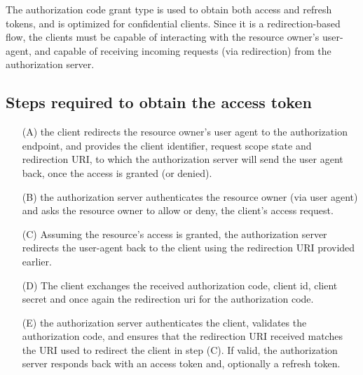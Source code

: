 \documentclass[11pt]{style}
\begin{document}
The authorization code grant type is used to obtain both access and refresh
tokens, and is optimized for confidential clients.
Since it is a redirection-based flow, the clients must be capable of interacting
with the resource owner's user-agent, and capable of receiving incoming requests
(via redirection) from the authorization server.

\subsection{Steps required to obtain the access token}
\begin{enumerate}
    \item[(A)] the client redirects the resource owner's user agent to the
        authorization endpoint, and provides the client identifier, request
        scope state and redirection URI, to which the authorization server will
        send the user agent back, once the access is granted (or denied).
    \item[(B)] the authorization server authenticates the resource owner (via
        user agent) and asks the resource owner to allow or deny, the client's
        access request.
    \item[(C)] Assuming the resource's access is granted, the authorization
        server redirects the user-agent back to the client using the redirection
        URI provided earlier.
    \item[(D)] The client exchanges the received authorization code, client id,
        client secret and once again the redirection uri for the authorization code.

    \item[(E)] the authorization server authenticates the client, validates the
        authorization code, and ensures that the redirection URI received
        matches the URI used to redirect the client in step (C). If valid, the
        authorization server responds back with an access token and,
        optionally a refresh token.
\end{enumerate}
\end{document}
